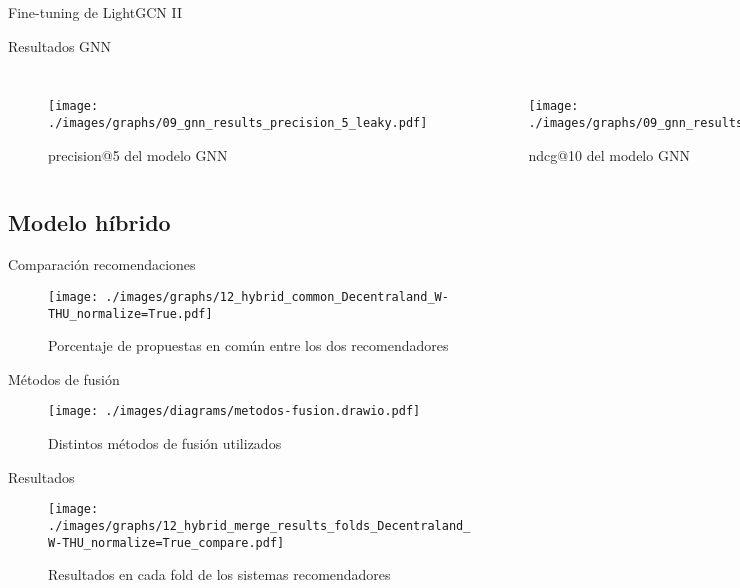 \begin{frame}{Fine-tuning de LightGCN II}
\begin{figure}
    \end{figure}
\end{frame}

\begin{frame}{Resultados GNN}
\begin{columns}
\begin{figure}
    \centering
    \texttt{[image: ./images/graphs/09\_gnn\_results\_precision\_5\_leaky.pdf]}
    \caption{precision@5 del modelo GNN}
\end{figure}
\begin{figure}
    \centering
    \texttt{[image: ./images/graphs/09\_gnn\_results\_ndcg\_10\_leaky.pdf]}
    \caption{ndcg@10 del modelo GNN}
\end{figure}
\end{columns}
\end{frame}

\subsection{Modelo híbrido}
\begin{frame}{Comparación recomendaciones}
    \begin{figure}
        \centering
        \texttt{[image: ./images/graphs/12\_hybrid\_common\_Decentraland\_W-THU\_normalize=True.pdf]}
        \caption{Porcentaje de propuestas en común entre los dos recomendadores}
    \end{figure}
\end{frame}    

\begin{frame}{Métodos de fusión}
    \begin{figure}
        \centering
        \texttt{[image: ./images/diagrams/metodos-fusion.drawio.pdf]}
        \caption{Distintos métodos de fusión utilizados}
    \end{figure}
\end{frame}

\begin{frame}{Resultados}
    \begin{figure}
        \centering
        \texttt{[image: ./images/graphs/12\_hybrid\_merge\_results\_folds\_Decentraland\_W-THU\_normalize=True\_compare.pdf]}
        \caption{Resultados en cada fold de los sistemas recomendadores}
    \end{figure}
\end{frame}